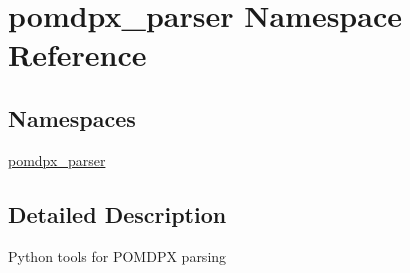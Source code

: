 \hypertarget{namespacepomdpx__parser}{}\section{pomdpx\+\_\+parser Namespace Reference}
\label{namespacepomdpx__parser}
\subsection*{Namespaces}
\begin{DoxyCompactItemize}
\item 
 \hyperlink{namespacepomdpx__parser_1_1pomdpx__parser}{pomdpx\+\_\+parser}
\end{DoxyCompactItemize}


\subsection{Detailed Description}
\begin{DoxyVerb}Python tools for POMDPX parsing
\end{DoxyVerb}
 
